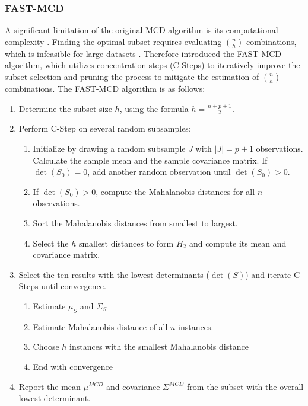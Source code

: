 \subsubsection*{FAST-MCD}
A significant limitation of the original MCD algorithm is its computational complexity \citep{rousseeuw1999fast}. 
Finding the optimal subset requires evaluating $\binom{n}{h}$ combinations, which is infeasible for large datasets \citep[Chapter 4]{rousseeuw1985multivariate}. 
Therefore \citet{rousseeuw1999fast} introduced the FAST-MCD algorithm, which utilizes concentration steps (C-Steps) to iteratively improve the subset selection and pruning the process to mitigate the estimation of $\binom{n}{h}$ combinations.
The FAST-MCD algorithm is as follows:
\begin{enumerate}[label=\arabic*.]
    \item   Determine the subset size $h$, using the formula $h = \frac{n + p + 1}{2}$.
    \item   Perform C-Step on several random subsamples:
    \begin{enumerate}[label=\theenumi.\arabic*]
        \item   Initialize by drawing a random subsample $J$ with $|J| = p+1$ observations. 
                Calculate the sample mean and the sample covariance matrix. 
                If $\det(S_0)=0$, add another random observation until $\det(S_0)>0$. 
        \item   If $\det(S_0) > 0$, compute the Mahalanobis distances for all $n$ observations.
        \item   Sort the Mahalanobis distances from smallest to largest.
        \item   Select the $h$ smallest distances to form $H_2$ and compute its mean and covariance matrix.
    \end{enumerate}
    \item Select the ten results with the lowest determinants ($\det(S)$) and iterate C-Steps until convergence.
    \begin{enumerate}
        \item Estimate $\mu_S$ and $\Sigma_S$
        \item Estimate Mahalanobis distance of all $n$ instances.
        \item Choose $h$ instances with the smallest Mahalanobis distance
        \item End with convergence
    \end{enumerate}
    \item Report the mean $\mu^{MCD}$ and covariance $\Sigma^{MCD}$ from the subset with the overall lowest determinant.
\end{enumerate}
\citep[Chapter 3]{rousseeuw1999fast}

